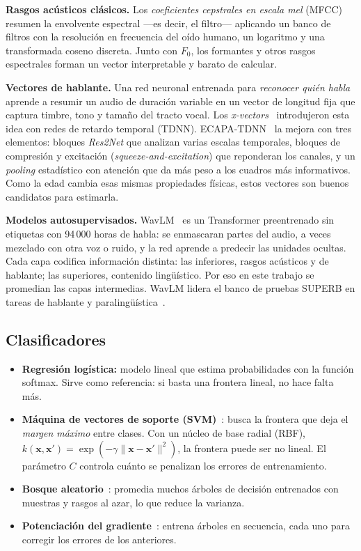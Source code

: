 \documentclass[11pt,a4paper]{article}
\begin{document}
\textbf{Rasgos acústicos clásicos.} Los \emph{coeficientes cepstrales en escala mel} (MFCC)~\cite{davis1980} resumen la envolvente espectral ---es decir, el filtro--- aplicando un banco de filtros con la resolución en frecuencia del oído humano, un logaritmo y una transformada coseno discreta. Junto con $F_0$, los formantes y otros rasgos espectrales forman un vector interpretable y barato de calcular.

\textbf{Vectores de hablante.} Una red neuronal entrenada para \emph{reconocer quién habla} aprende a resumir un audio de duración variable en un vector de longitud fija que captura timbre, tono y tamaño del tracto vocal. Los \emph{x-vectors}~\cite{xvector2018} introdujeron esta idea con redes de retardo temporal (TDNN). ECAPA-TDNN~\cite{ecapa2020} la mejora con tres elementos: bloques \emph{Res2Net} que analizan varias escalas temporales, bloques de compresión y excitación (\emph{squeeze-and-excitation}) que reponderan los canales, y un \emph{pooling} estadístico con atención que da más peso a los cuadros más informativos. Como la edad cambia esas mismas propiedades físicas, estos vectores son buenos candidatos para estimarla.

\textbf{Modelos autosupervisados.} WavLM~\cite{wavlm2022} es un Transformer preentrenado sin etiquetas con 94\,000 horas de habla: se enmascaran partes del audio, a veces mezclado con otra voz o ruido, y la red aprende a predecir las unidades ocultas. Cada capa codifica información distinta: las inferiores, rasgos acústicos y de hablante; las superiores, contenido lingüístico. Por eso en este trabajo se promedian las capas intermedias. WavLM lidera el banco de pruebas SUPERB en tareas de hablante y paralingüística~\cite{superb2021}.

\subsection{Clasificadores}

\begin{itemize}
  \item \textbf{Regresión logística:} modelo lineal que estima probabilidades con la función softmax. Sirve como referencia: si basta una frontera lineal, no hace falta más.
  \item \textbf{Máquina de vectores de soporte (SVM)}~\cite{svm1995}: busca la frontera que deja el \emph{margen máximo} entre clases. Con un núcleo de base radial (RBF), $k(\mathbf{x},\mathbf{x}') = \exp(-\gamma\lVert\mathbf{x}-\mathbf{x}'\rVert^2)$, la frontera puede ser no lineal. El parámetro $C$ controla cuánto se penalizan los errores de entrenamiento.
  \item \textbf{Bosque aleatorio}~\cite{rf2001}: promedia muchos árboles de decisión entrenados con muestras y rasgos al azar, lo que reduce la varianza.
  \item \textbf{Potenciación del gradiente}~\cite{friedman2001}: entrena árboles en secuencia, cada uno para corregir los errores de los anteriores.
\end{itemize}
\end{document}
